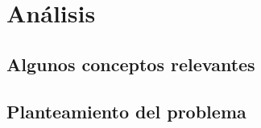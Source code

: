 \chapter{Análisis}
	\label{chap:four}

\section{Algunos conceptos relevantes}
	
\section{Planteamiento del problema}

